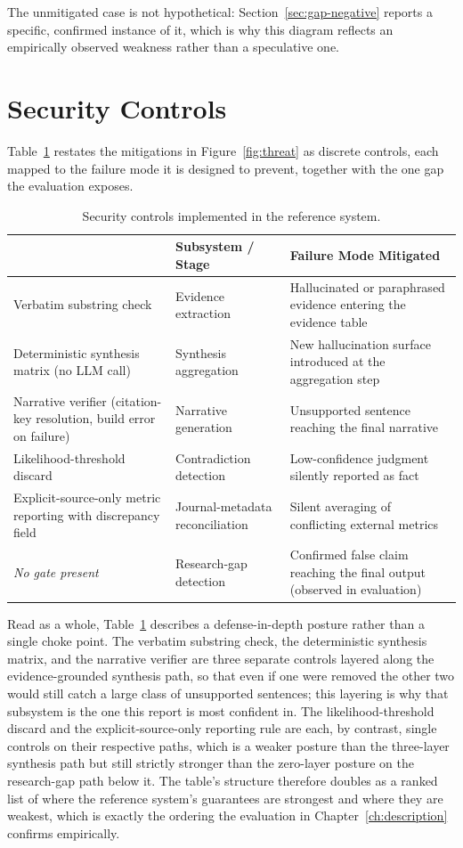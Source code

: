 \documentclass[12pt,a4paper]{report}
\renewcommand{\arraystretch}{1.25}
\newcommand{\headrow}{\rowcolor{navy}}
\newcommand{\hd}[1]{{\color{white}\bfseries #1}}
\begin{document}
The unmitigated case is not hypothetical: Section~\ref{sec:gap-negative}
reports a specific, confirmed instance of it, which is why this diagram
reflects an empirically observed weakness rather than a speculative one.

\section{Security Controls}
Table~\ref{tab:controls} restates the mitigations in Figure~\ref{fig:threat}
as discrete controls, each mapped to the failure mode it is designed to
prevent, together with the one gap the evaluation exposes.

\begin{table}[H]
\centering
\caption{Security controls implemented in the reference system.}
\label{tab:controls}
\renewcommand{\arraystretch}{1.05}
\begin{tabular}{@{}p{4.2cm}p{3.6cm}p{5.6cm}@{}}
\toprule
\headrow \hd{Control} & \hd{Subsystem / Stage} & \hd{Failure Mode Mitigated} \\
\midrule
Verbatim substring check & Evidence extraction & Hallucinated or paraphrased
evidence entering the evidence table \\
Deterministic synthesis matrix (no LLM call) & Synthesis aggregation & New
hallucination surface introduced at the aggregation step \\
Narrative verifier (citation-key resolution, build error on failure) &
Narrative generation & Unsupported sentence reaching the final narrative \\
Likelihood-threshold discard & Contradiction detection & Low-confidence
judgment silently reported as fact \\
Explicit-source-only metric reporting with discrepancy field & Journal-metadata
reconciliation & Silent averaging of conflicting external metrics \\
\midrule
\emph{No gate present} & Research-gap detection & Confirmed false claim
reaching the final output (observed in evaluation) \\
\bottomrule
\end{tabular}
\renewcommand{\arraystretch}{1.25}
\end{table}

Read as a whole, Table~\ref{tab:controls} describes a defense-in-depth
posture rather than a single choke point. The verbatim substring check, the
deterministic synthesis matrix, and the narrative verifier are three separate
controls layered along the evidence-grounded synthesis path, so that even if
one were removed the other two would still catch a large class of
unsupported sentences; this layering is why that subsystem is the one this
report is most confident in. The likelihood-threshold discard and the
explicit-source-only reporting rule are each, by contrast, single controls on
their respective paths, which is a weaker posture than the three-layer
synthesis path but still strictly stronger than the zero-layer posture on the
research-gap path below it. The table's structure therefore doubles as a
ranked list of where the reference system's guarantees are strongest and
where they are weakest, which is exactly the ordering the evaluation in
Chapter~\ref{ch:description} confirms empirically.
\end{document}
